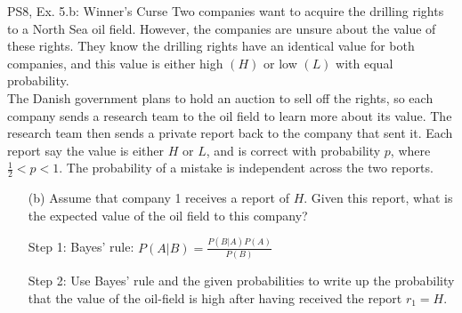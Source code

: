 \begin{frame}{PS8, Ex. 5.b: Winner's Curse}
      Two companies want to acquire the drilling rights to a North Sea oil field. However, the companies are unsure about the value of these rights. They know the drilling rights have an identical value for both companies, and this value is either high $(H)$ or low $(L)$ with equal probability.\\\medskip
      The Danish government plans to hold an auction to sell off the rights, so each company sends a research team to the oil field to learn more about its value. The research team then sends a private report back to the company that sent it. Each report say the value is either $H$ or $L$, and is correct with probability $p$, where $\frac{1}{2} < p < 1$. The probability of a mistake is independent across the two reports.
      \begin{itemize}
        \item[(b)] Assume that company 1 receives a report of $H$. Given this report, what is the expected value of the oil field to this company?
        \item[Step 1:] Bayes' rule: $P(A|B)=\frac{P(B|A)P(A)}{P(B)}$
        \item[Step 2:] Use Bayes' rule and the given probabilities to write up the probability that the value of the oil-field is high after having received the report $r_1=H$.
      \end{itemize}
      \vfill\null
\end{frame}
